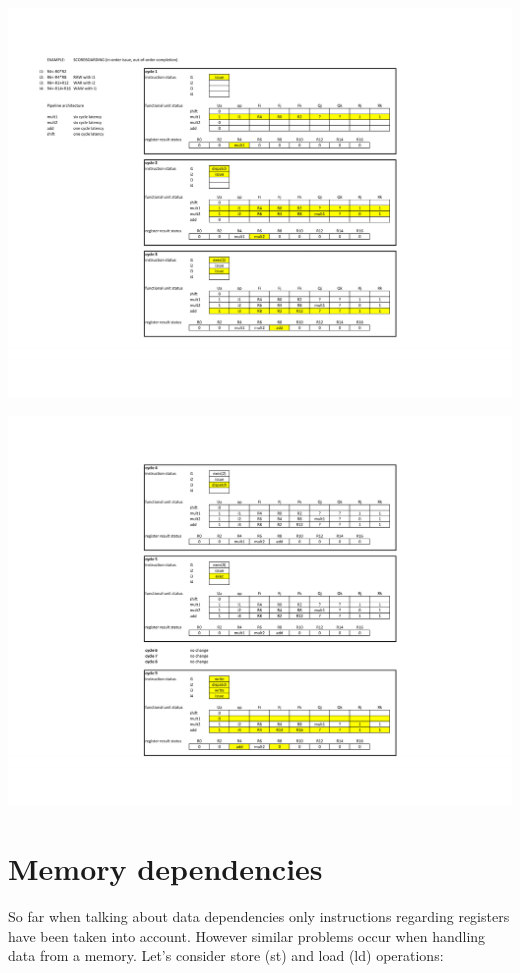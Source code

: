 \begin{center}
  \includegraphics[width=1.0\linewidth]{img/img3/score1}
\end{center}
\begin{center}
  \includegraphics[width=1.0\linewidth]{img/img3/score2}
\end{center}


\section{Memory dependencies}
So far when talking about data dependencies only instructions regarding registers have been taken into account. However similar problems occur when handling data from a memory. Let's consider store (st) and load (ld) operations:

